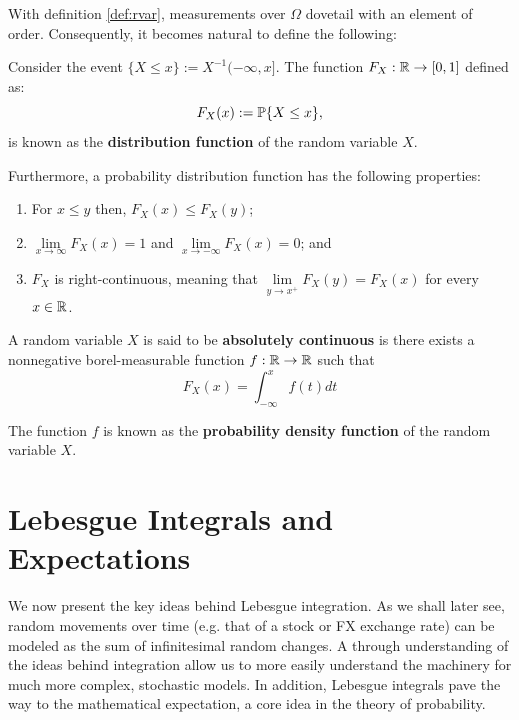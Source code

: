 \documentclass[../TGMAFFIRO.tex]{subfiles}
\begin{document}
With definition \ref{def:rvar}, measurements over $\Omega$ dovetail with an element of order. Consequently, it becomes natural to define the following:

\begin{definition}\label{dist_func}
	Consider the event $\{X \leq x\} := X^{-1}(-\infty, x]$. The function $F_X: \mathbb{R} \rightarrow [0, 1]$ defined as:
	\begin{equation}
		F_X(x) := \mathbb{P}\{X \leq x\},
	\end{equation}
	is known as the \textbf{distribution function} of the random variable $X$.
\end{definition}

Furthermore, a probability distribution function has the following properties:
\begin{enumerate}
	\item For $x \leq y$ then, $F_X(x) \leq F_X(y)$;
	\item $\lim\limits_{x\to\infty} F_X(x) = 1$ and $\lim\limits_{x\to - \infty} F_X(x) = 0$; and
	\item $F_X$ is right-continuous, meaning that $\lim\limits_{y\to x^+} F_X(y) = F_X(x)$ for every $x \in \mathbb{R}$.
\end{enumerate}

\begin{definition}
	A random variable $X$ is said to be \textbf{absolutely continuous} is there exists a nonnegative borel-measurable function $f: \mathbb{R}\rightarrow\mathbb{R}$ such that 
	\begin{equation}
		F_X(x) = \int_{-\infty}^{x} f(t) dt
	\end{equation}
\end{definition}

The function $f$ is known as the \textbf{probability density function} of the random variable $X$.

\section{Lebesgue Integrals and Expectations}
We now present the key ideas behind Lebesgue integration. As we shall later see, random movements over time (e.g. that of a stock or FX exchange rate) can be modeled as the sum of infinitesimal random changes. A through understanding of the ideas behind integration allow us to more easily understand the machinery for much more complex, stochastic models. In addition, Lebesgue integrals pave the way to the mathematical expectation, a core idea in the theory of probability.\\
\end{document}
